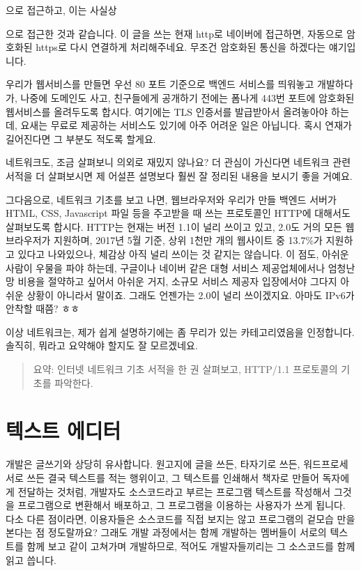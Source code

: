 \documentclass[11pt,a4paper]{article}
\begin{document}
으로 접근하고, 이는 사실상

\begin{quote}
\end{quote}

으로 접근한 것과 같습니다. 이 글을 쓰는 현재 http로 네이버에 접근하면, 자동으로 암호화된 https로 다시 연결하게 처리해주네요. 무조건 암호화된 통신을 하겠다는 얘기입니다.

우리가 웹서비스를 만들면 우선 80 포트 기준으로 백엔드 서비스를 띄워놓고 개발하다가, 나중에 도메인도 사고, 친구들에게 공개하기 전에는 폼나게 443번 포트에 암호화된 웹서비스를 올려두도록 합시다. 여기에는 TLS 인증서를 발급받아서 올려놓아야 하는데, 요새는 무료로 제공하는 서비스도 있기에 아주 어려운 일은 아닙니다. 혹시 연재가 길어진다면 그 부분도 적도록 할게요.

네트워크도, 조금 살펴보니 의외로 재밌지 않나요? 더 관심이 가신다면 네트워크 관련 서적을 더 살펴보시면 제 어설픈 설명보다 훨씬 잘 정리된 내용을 보시기 좋을 거예요.

그다음으로, 네트워크 기초를 보고 나면, 웹브라우저와 우리가 만들 백엔드 서버가 HTML, CSS, Javascript 파일 등을 주고받을 때 쓰는 프로토콜인 HTTP에 대해서도 살펴보도록 합시다. HTTP는 현재는 버전 1.1이 널리 쓰이고 있고, 2.0도 거의 모든 웹브라우저가 지원하며, 2017년 5월 기준, 상위 1천만 개의 웹사이트 중 13.7\%가 지원하고 있다고 나와있으나, 체감상 아직 널리 쓰이는 것 같지는 않습니다. 이 점도, 아쉬운 사람이 우물을 파야 하는데, 구글이나 네이버 같은 대형 서비스 제공업체에서나 엄청난 망 비용을 절약하고 싶어서 아쉬운 거지, 소규모 서비스 제공자 입장에서야 그다지 아쉬운 상황이 아니라서 말이죠. 그래도 언젠가는 2.0이 널리 쓰이겠지요. 아마도 IPv6가 안착할 때쯤? ㅎㅎ

이상 네트워크는, 제가 쉽게 설명하기에는 좀 무리가 있는 카테고리였음을 인정합니다. 솔직히, 뭐라고 요약해야 할지도 잘 모르겠네요.

\begin{verse}
요약: 인터넷 네트워크 기초 서적을 한 권 살펴보고, HTTP/1.1 프로토콜의 기초를 파악한다.
\end{verse}

\section{텍스트 에디터}

개발은 글쓰기와 상당히 유사합니다. 원고지에 글을 쓰든, 타자기로 쓰든, 워드프로세서로 쓰든 결국 텍스트를 적는 행위이고, 그 텍스트를 인쇄해서 책자로 만들어 독자에게 전달하는 것처럼, 개발자도 소스코드라고 부르는 프로그램 텍스트를 작성해서 그것을 프로그램으로 변환해서 배포하고, 그 프로그램을 이용하는 사용자가 쓰게 됩니다. 다소 다른 점이라면, 이용자들은 소스코드를 직접 보지는 않고 프로그램의 겉모습 만을 본다는 점 정도랄까요? 그래도 개발 과정에서는 함께 개발하는 멤버들이 서로의 텍스트를 함께 보고 같이 고쳐가며 개발하므로, 적어도 개발자들끼리는 그 소스코드를 함께 읽고 씁니다.
\end{document}
